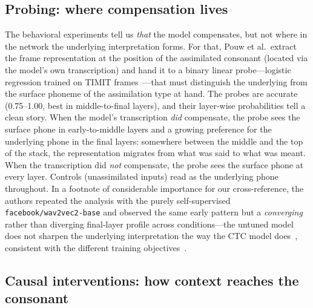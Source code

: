 \documentclass[11pt,a4paper]{article}
\newcommand{\sampa}[1]{\texttt{#1}}
\begin{document}
\subsection{Probing: where compensation lives}

The behavioral experiments tell us \emph{that} the model compensates,
but not where in the network the underlying interpretation forms. For
that, Pouw et al.\ extract the frame representation at the position of
the assimilated consonant (located via the model's own transcription)
and hand it to a binary linear probe---logistic regression trained on
TIMIT frames~\citep{garofolo1993}---that must distinguish the
underlying from the surface phoneme of the assimilation type at hand.
The probes are accurate (0.75--1.00, best in middle-to-final layers),
and their layer-wise probabilities tell a clean story. When the model's
transcription \emph{did} compensate, the probe sees the surface phone
in early-to-middle layers and a growing preference for the underlying
phone in the final layers: somewhere between the middle and the top of
the stack, the representation migrates from what was said to what was
meant. When the transcription did \emph{not} compensate, the probe sees
the surface phone at every layer. Controls (unassimilated inputs) read
as the underlying phone throughout. In a footnote of considerable
importance for our cross-reference, the authors repeated the analysis
with the purely self-supervised \sampa{facebook/wav2vec2-base} and
observed the same early pattern but a \emph{converging} rather than
diverging final-layer profile across conditions---the untuned model
does not sharpen the underlying interpretation the way the CTC model
does~\citep{pouw2024}, consistent with the different training
objectives~\citep{pasad2021}.

\subsection{Causal interventions: how context reaches the consonant}
\end{document}
